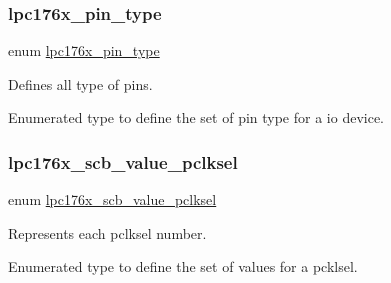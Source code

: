 \subsubsection{\texorpdfstring{lpc176x\_pin\_type}{lpc176x\_pin\_type}}
{\footnotesize\ttfamily enum \mbox{\hyperlink{io-defs_8h_a7591f1cf553f174941b6ebaeb85d5970}{lpc176x\+\_\+pin\+\_\+type}}}



Defines all type of pins. 

Enumerated type to define the set of pin type for a io device. \mbox{\label{io-defs_8h_acd0dc32b7d4201190606b67e031151dd}} 
\subsubsection{\texorpdfstring{lpc176x\_scb\_value\_pclksel}{lpc176x\_scb\_value\_pclksel}}
{\footnotesize\ttfamily enum \mbox{\hyperlink{io-defs_8h_acd0dc32b7d4201190606b67e031151dd}{lpc176x\+\_\+scb\+\_\+value\+\_\+pclksel}}}



Represents each pclksel number. 

Enumerated type to define the set of values for a pcklsel. 